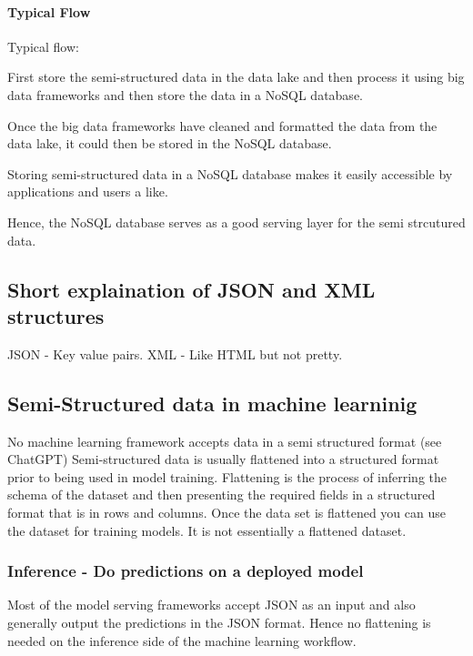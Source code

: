 \documentclass[a4paper, 11pt]{article}
\begin{document}
    \paragraph{Typical Flow}
    Typical flow:
    \begin{item}
    \item First store the semi-structured data in the data lake and then process it using big data frameworks and then store the data in a NoSQL database.
    \item Once the big data frameworks have cleaned and formatted the data from the data lake, it could then be stored in the NoSQL database.
    \item Storing semi-structured data in a NoSQL database makes it easily accessible by applications and users a like.
    \item Hence, the NoSQL database serves as a good serving layer for the semi strcutured data.
    \end{item}

    \subsection{Short explaination of JSON and XML structures}
    JSON - Key value pairs.
    XML - Like HTML but not pretty.

    \subsection{Semi-Structured data in machine learninig}
    No machine learning framework accepts data in a semi structured format (see ChatGPT)
    Semi-structured data is usually flattened into a structured format prior to being used in model training.
    Flattening is the process of inferring the schema of the dataset and then presenting the required fields in a structured format that is in rows and columns.
    Once the data set is flattened you can use the dataset for training models.
    It is not essentially a flattened dataset.

    \subsubsection{Inference - Do predictions on a deployed model}

    Most of the model serving frameworks accept JSON as an input and also generally output the predictions in the JSON format.
    Hence no flattening is needed on the inference side of the machine learning workflow.
\end{document}
